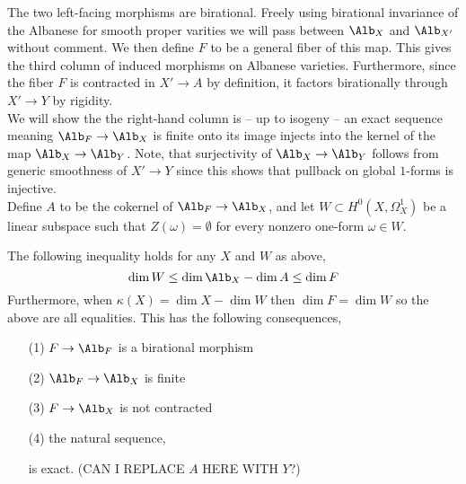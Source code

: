 \documentclass[12pt]{article}
\begin{document}
\begin{center}
\end{center}
The two left-facing morphisms are birational. Freely using birational invariance of the Albanese for smooth proper varities we will pass between $\Alb_{X}$ and $\Alb_{X'}$ without comment. We then define $F$ to be a general fiber of this map. This gives the third column of induced morphisms on Albanese varieties. Furthermore, since the fiber $F$ is contracted in $X' \to A$ by definition, it factors birationally through $X' \to Y$ by rigidity. 
\bigskip\\
We will show the the right-hand column is -- up to isogeny -- an exact sequence meaning $\Alb_{F} \to \Alb_{X}$ is finite \etale onto its image injects into the kernel of the map $\Alb_{X} \rightarrow \Alb_{Y}$. Note, that surjectivity of $\Alb_X \to \Alb_Y$ follows from generic smoothness of $X' \to Y$ since this shows that pullback on global $1$-forms is injective.  
\bigskip\\
Define $A$ to be the cokernel of $\Alb_F \to \Alb_X$, and let $W \subset H^{0}(X, \Omega_{X}^{1})$ be a linear subspace such that $Z(\omega) = \emptyset$ for every nonzero one-form $\omega \in W$.

\begin{lemma}
The following inequality holds for any $X$ and $W$ as above,
\[ \dim{W} \le \dim{\Alb_X} - \dim{A} \le \dim{F} \]
Furthermore, when $\kappa(X) = \dim{X} - \dim{W}$ then $\dim{F} = \dim{W}$ so the above are all equalities. This has the following consequences,
\begin{enumerate}
\item[(1)] $F \to \Alb_F$ is a birational morphism 
\item[(2)] $\Alb_F \to \Alb_X$ is finite \etale 
\item[(3)] $F \to \Alb_X$ is not contracted
\item[(4)] the natural sequence,
\begin{center}
\end{center}
is exact. (CAN I REPLACE $A$ HERE WITH $Y$?)
\end{enumerate}
\end{lemma}
\end{document}
